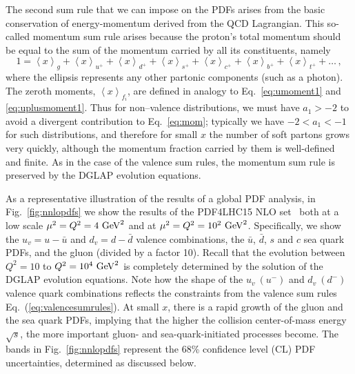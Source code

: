 The second sum rule that we can impose on the PDFs arises
from the basic conservation of energy-momentum derived from
the QCD Lagrangian.
%
This so-called momentum sum rule arises
because the proton's total momentum should be equal to the sum of the momentum
carried by all its constituents, namely
\begin{equation}\label{eq:mom}
1 = \left\langle x\right\rangle _{g}+\left\langle x\right\rangle _{u^{+}}+\left\langle x\right\rangle _{d^{+}}+\left\langle x\right\rangle _{s^{+}}+\left\langle x\right\rangle _{c^{+}}+\left\langle x\right\rangle _{b^{+}}+\left\langle x\right\rangle _{t^{+}}+\ldots\,,
\end{equation}
%
where the ellipsis represents any other partonic components (such
as a photon). The zeroth moments, $\left\langle x\right\rangle _{f_i}$, are defined in analogy to Eq.~\eqref{eq:umoment1} and \eqref{eq:uplusmoment1}. Thus for non--valence distributions, we must have $a_1>-2$ to avoid a divergent contribution to
Eq.~\eqref{eq:mom}; typically we have $-2<a_1<-1$ for such distributions, and therefore for small $x$ the number of soft partons
grows very quickly, although the momentum fraction carried by them is well-defined
and finite.
%
As in the case of the valence sum rules, the momentum
sum rule is preserved by the DGLAP evolution equations.

As a representative illustration of the results of a global
PDF analysis, in Fig.~\ref{fig:nnlopdfs} we show
the results of the PDF4LHC15 NLO set~\cite{Butterworth:2015oua}
both at a low scale
    $\mu^2=Q^2=4~{\rm GeV}^2$  and at
    $\mu^2=Q^2=10^2~{\rm GeV}^2$.
    Specifically, we show the  $u_v=u-\bar{u}$ and $d_v=d-\bar{d}$ valence combinations, the $\bar{u}$,
    $\bar{d}$, $s$ and $c$ sea quark PDFs, and the gluon (divided by a factor 10).
    Recall that the evolution between $Q^2=10$ to $Q^2=10^4~{\rm GeV}^2$ is completely
    determined by the solution of
     the DGLAP evolution equations.
    Note how the shape of the $u_v~(u^{-})$ and $d_v~(d^{-})$ valence quark combinations
    reflects the constraints from the valence sum rules Eq.~(\ref{eq:valencesumrules}).
    At small $x$, there is a rapid growth of the gluon and the sea quark PDFs, implying
    that the higher the collision center-of-mass energy $\sqrt{s}$, the more
    important gluon- and sea-quark-initiated processes become.
    The bands in Fig.~\ref{fig:nnlopdfs} represent the 68\% confidence level (CL)
    PDF uncertainties, determined as discussed below.

